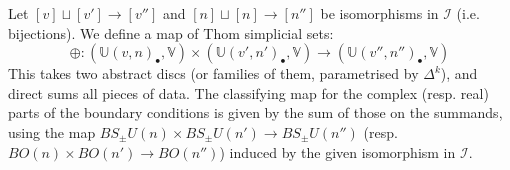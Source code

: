 \documentclass{TPmod}
\def\bU{\mathbb{U}}
\def\bV{\mathbb{V}}
\newcommand{\cI}{\mathcal{I}}
\numberwithin{equation}{section}
\begin{document}
    \begin{defn}
        Let $[v] \sqcup [v'] \to [v'']$ and $[n] \sqcup [n] \to [n'']$ be isomorphisms in $\cI$ (i.e. bijections). We define a map of Thom simplicial sets:
        \begin{equation}
            \oplus: \left(\bU(v, n)_\bullet, \bV\right) \times \left(\bU(v',n')_\bullet, \bV\right) \to \left(\bU(v'',n'')_\bullet, \bV\right)
        \end{equation}
        This takes two abstract discs (or families of them, parametrised by $\Delta^k$), and direct sums all pieces of data. The classifying map for the complex (resp. real) parts of the boundary conditions is given by the sum of those on the summands, using the map $BS_\pm U(n) \times BS_\pm U(n') \to BS_\pm U(n'')$ (resp. $BO(n) \times BO(n') \to BO(n'')$) induced by the given isomorphism in $\cI$.
    \end{defn}
    
\end{document}
